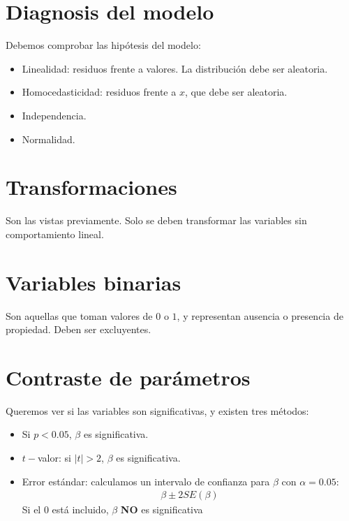 \documentclass{article}
\begin{document}
\section{Diagnosis del modelo}
Debemos comprobar las hipótesis del modelo:
\begin{itemize}
    \item Linealidad: residuos frente a valores. La distribución debe ser aleatoria.
    \item Homocedasticidad: residuos frente a $x$, que debe ser aleatoria.
    \item Independencia.
    \item Normalidad.
\end{itemize}
\section{Transformaciones}
Son las vistas previamente. Solo se deben transformar las variables sin comportamiento lineal.
\section{Variables binarias}
Son aquellas que toman valores de $0$ o $1$, y representan ausencia o presencia de propiedad.
Deben ser excluyentes.
\section{Contraste de parámetros}
Queremos ver si las variables son significativas, y existen tres métodos:
\begin{itemize}
    \item Si $p<0.05$, $\beta $ es significativa.
    \item $t-$valor: si $|t|>2$, $\beta $ es significativa.
    \item Error estándar: calculamos un intervalo de confianza para $\beta $ con $\alpha =0.05$:
    \begin{equation}
        \begin{split}
            \beta \pm 2 SE(\beta )
        \end{split}
    \end{equation}
    Si el $0$ está incluido, $\beta $ \textbf{NO} es significativa
\end{itemize}
\end{document}
